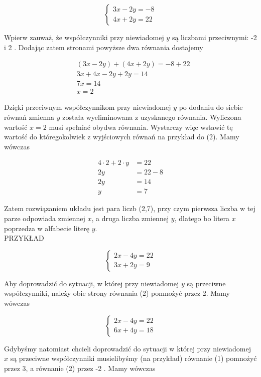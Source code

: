 \documentclass[10pt]{article}
\begin{document}
\[
\left\{\begin{array}{l}
3 x-2 y=-8 \\
4 x+2 y=22
\end{array}\right.
\]

Wpierw zauważ, że współczynniki przy niewiadomej \(y\) są liczbami przeciwnymi: -2 i 2 . Dodając zatem stronami powyższe dwa równania dostajemy

\[
\begin{aligned}
& (3 x-2 y)+(4 x+2 y)=-8+22 \\
& 3 x+4 x-2 y+2 y=14 \\
& 7 x=14 \\
& x=2
\end{aligned}
\]

Dzięki przeciwnym współczynnikom przy niewiadomej \(y\) po dodaniu do siebie równań zmienna \(y\) została wyeliminowana z uzyskanego równania. Wyliczona wartość \(x=2\) musi spełniać obydwa równania. Wystarczy więc wstawić tę wartość do któregokolwiek z wyjściowych równań na przykład do (2). Mamy wówczas

\[
\begin{aligned}
4 \cdot 2+2 \cdot y & =22 \\
2 y & =22-8 \\
2 y & =14 \\
y & =7
\end{aligned}
\]

Zatem rozwiązaniem układu jest para liczb (2,7), przy czym pierwsza liczba w tej parze odpowiada zmiennej \(x\), a druga liczba zmiennej \(y\), dlatego bo litera \(x\) poprzedza w alfabecie literę \(y\).\\
PRZYKŁAD

\[
\left\{\begin{array}{l}
2 x-4 y=22 \\
3 x+2 y=9
\end{array}\right.
\]

Aby doprowadzić do sytuacji, w której przy niewiadomej \(y\) są przeciwne współczynniki, należy obie strony równania (2) pomnożyć przez 2. Mamy wówczas

\[
\left\{\begin{array}{l}
2 x-4 y=22 \\
6 x+4 y=18
\end{array}\right.
\]

Gdybyśmy natomiast chcieli doprowadzić do sytuacji w której przy niewiadomej \(x\) są przeciwne współczynniki musielibyśmy (na przykład) równanie (1) pomnożyć przez 3, a równanie (2) przez -2 . Mamy wówczas
\end{document}
